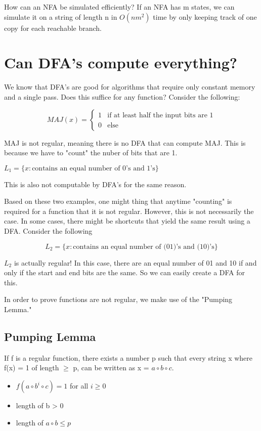 \hr 

How can an NFA be simulated efficiently? If an NFA has m states, we can simulate it on a string of length n in $O(nm^2)$ time by only keeping track of one copy for each reachable branch.

\hr 

\section{Can DFA's compute everything?}

We know that DFA's are good for algorithms that require only constant memory and a single pass. Does this suffice for any function? Consider the following:

\begin{equation*}
    MAJ(x) = 
    \begin{cases}
        1 & \text{if at least half the input bits are 1} \\
        0 & \text{else}
    \end{cases}
\end{equation*}

MAJ is not regular, meaning there is no DFA that can compute MAJ. This is because we have to "count" the nuber of bits that are 1. 

\begin{example}
    
    $L_1 = \{ x: \text{contains an equal number of 0's and 1's}\} $

    This is also not computable by DFA's for the same reason.
\end{example}

Based on these two examples, one might thing that anytime "counting" is required for a function that it is not regular. However, this is not necessarily the case. In some cases, there might be shortcuts that yield the same result using a DFA. Consider the following

\[
    L_2 = \{x: \text{contains an equal number of (01)'s and (10)'s}\}
\]

$L_2$ is actually regular! In this case, there are an equal number of 01 and 10 if and only if the start and end bits are the same. So we can easily create a DFA for this. 

In order to prove functions are not regular, we make use of the "Pumping Lemma."

\subsection*{Pumping Lemma}
If f is a regular function, there exists a number p such that every string x where f(x) = 1 of length $\ge$ p, can be written as x = $a \circ b \circ c$.
\begin{itemize}
    \item $f(a \circ b^i \circ c) = 1$ for all $i \ge 0$
    \item length of b > 0
    \item length of $a \circ b \le p$
\end{itemize}

